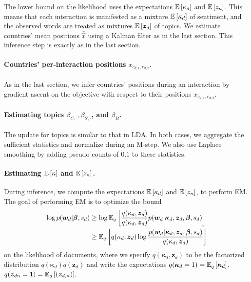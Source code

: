 The lower bound on the likelihood uses the expectations
$\mathbb{E}\left[\kappa_d\right]$ and $\mathbb{E}\left[z_n\right]$.  This means that each
interaction is manifested as a mixture $\mathbb{E}\left[\kappa_d\right]$ of
sentiment, and the observed words are treated as mixtures $\mathbb{E}\left[\bm
  z_d\right]$ of topics.  We estimate countries' mean positions $\bar \hat
x$ using a Kalman filter \cite{kalman:1960} as in the last section.
This inference step is exactly as in the last section.


\paragraph{Countries' per-interaction positions $x_{c_{d,1}, c_{d,2}}$.}
As in the last section, we infer countries' positions during an
interaction by gradient ascent on the objective with respect to their
positions $x_{c_{d,1}, c_{d,2}}$.

\paragraph{Estimating topics $\beta_{C, \cdot}, \beta_{S, \cdot}$, and $\beta_{B}$.}
The update for topics is similar to that in LDA.  In both cases, we
aggregate the sufficient statistics and normalize during an M-step.
We also use Laplace smoothing by adding pseudo counts of
$0.1$ to these statistics.

\paragraph{Estimating $\mathbb{E}\left[\kappa\right]$ and $\mathbb{E}\left[z_n\right]$.}
During inference, we compute the expectations $\mathbb{E}\left[\kappa_d\right]$ and
$\mathbb{E}\left[z_n\right]$, to perform EM.  The goal of performing EM is to optimize the bound
\begin{align}
  \log p(\bm w_d | \bm \beta, s_d)
  & \ge \log \mathbb{E}_q\left[ \frac{q(\kappa_d, \bm z_d)}{q(\kappa_d, \bm z_d)} p(\bm w_d | \bm \kappa_d, \bm z_d, \bm \beta, s_d) \right] \\
  & \ge \mathbb{E}_q\left[ q(\kappa_d, \bm z_d) \log \frac{p(\bm w_d | \bm \kappa_d, \bm z_d, \bm \beta, s_d)}{q(\kappa_d, \bm z_d)} \right]
\end{align}
on the likelihood of documents, where we specify $q(\bm \kappa_d, \bm
z_d)$ to be the factorized distribution $q(\bm \kappa_d) q(\bm z_d)$
and write the expectations $q(\bm \kappa_{d} = 1) = \mathbb{E}_q\left[\bm
  \kappa_d\right]$, $q(\bm z_{dn}=1) = \mathbb{E}_q\left[(\bm z_{d,n})\right]$.

